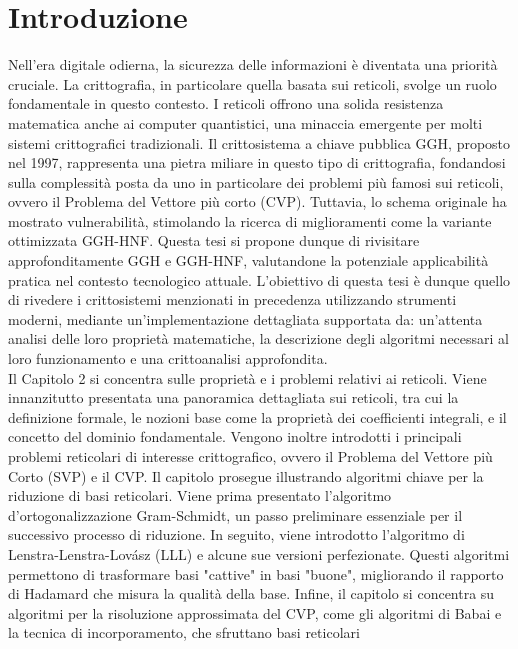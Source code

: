 \chapter{Introduzione}
\label{cap1}

Nell'era digitale odierna, la sicurezza delle informazioni è diventata una priorità 
cruciale. La crittografia, in particolare quella basata sui reticoli, svolge un ruolo 
fondamentale in questo contesto. I reticoli offrono una solida resistenza matematica 
anche ai computer quantistici, una minaccia emergente per molti sistemi crittografici 
tradizionali.
Il crittosistema a chiave pubblica GGH, proposto nel 1997, rappresenta una pietra miliare 
in questo tipo di 
crittografia, fondandosi sulla complessità posta da uno in particolare dei problemi più famosi
sui reticoli, ovvero il Problema del Vettore più corto (CVP).
Tuttavia, lo schema originale ha mostrato vulnerabilità, stimolando la ricerca di miglioramenti 
come la variante ottimizzata GGH-HNF.
Questa tesi si propone dunque di rivisitare approfonditamente GGH e GGH-HNF, valutandone la 
potenziale applicabilità pratica nel contesto tecnologico attuale. L'obiettivo di questa tesi è dunque 
quello di rivedere i crittosistemi menzionati in precedenza utilizzando strumenti moderni, mediante 
un'implementazione dettagliata supportata da: un'attenta analisi delle loro proprietà 
matematiche, la descrizione degli algoritmi necessari al loro funzionamento e una crittoanalisi 
approfondita.\\
Il Capitolo 2 si concentra sulle proprietà e i problemi relativi ai reticoli. 
Viene innanzitutto presentata una panoramica dettagliata sui reticoli, tra cui la 
definizione formale, le nozioni base come la proprietà dei coefficienti integrali, e il 
concetto del dominio fondamentale. Vengono inoltre introdotti i principali problemi 
reticolari di interesse crittografico, ovvero il Problema del Vettore più Corto (SVP) e 
il CVP. Il capitolo prosegue illustrando algoritmi 
chiave per la riduzione di basi reticolari. Viene prima presentato l'algoritmo d'ortogonalizzazione
Gram-Schmidt, un passo preliminare essenziale per il successivo processo di riduzione. In seguito, 
viene introdotto l'algoritmo di Lenstra-Lenstra-Lovász (LLL) e alcune sue versioni perfezionate. 
Questi algoritmi permettono di trasformare 
basi "cattive" in basi "buone", migliorando il rapporto di Hadamard che misura la qualità 
della base.
Infine, il capitolo si concentra su algoritmi per la risoluzione approssimata del CVP, 
come gli algoritmi di Babai e la tecnica di incorporamento, che sfruttano basi reticolari 
